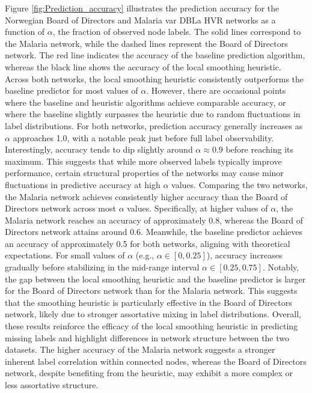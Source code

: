 \documentclass[12pt]{article}
\begin{document}
Figure \ref{fig:Prediction_accuracy} illustrates the prediction accuracy for the Norwegian Board of Directors and Malaria var DBLa HVR networks as a function of $\alpha$, the fraction of observed node labels. The solid lines correspond to the Malaria network, while the dashed lines represent the Board of Directors network. The red line indicates the accuracy of the baseline prediction algorithm, whereas the black line shows the accuracy of the local smoothing heuristic. Across both networks, the local smoothing heuristic consistently outperforms the baseline predictor for most values of $\alpha$. However, there are occasional points where the baseline and heuristic algorithms achieve comparable accuracy, or where the baseline slightly surpasses the heuristic due to random fluctuations in label distributions. For both networks, prediction accuracy generally increases as $\alpha$ approaches 1.0, with a notable peak just before full label observability. Interestingly, accuracy tends to dip slightly around $\alpha \approx 0.9$ before reaching its maximum. This suggests that while more observed labels typically improve performance, certain structural properties of the networks may cause minor fluctuations in predictive accuracy at high $\alpha$ values. Comparing the two networks, the Malaria network achieves consistently higher accuracy than the Board of Directors network across most $\alpha$ values. Specifically, at higher values of $\alpha$, the Malaria network reaches an accuracy of approximately 0.8, whereas the Board of Directors network attains around 0.6. Meanwhile, the baseline predictor achieves an accuracy of approximately 0.5 for both networks, aligning with theoretical expectations. For small values of $\alpha$ (e.g., $\alpha \in [0, 0.25]$), accuracy increases gradually before stabilizing in the mid-range interval $\alpha \in [0.25, 0.75]$. Notably, the gap between the local smoothing heuristic and the baseline predictor is larger for the Board of Directors network than for the Malaria network. This suggests that the smoothing heuristic is particularly effective in the Board of Directors network, likely due to stronger assortative mixing in label distributions. Overall, these results reinforce the efficacy of the local smoothing heuristic in predicting missing labels and highlight differences in network structure between the two datasets. The higher accuracy of the Malaria network suggests a stronger inherent label correlation within connected nodes, whereas the Board of Directors network, despite benefiting from the heuristic, may exhibit a more complex or less assortative structure.
\end{document}
